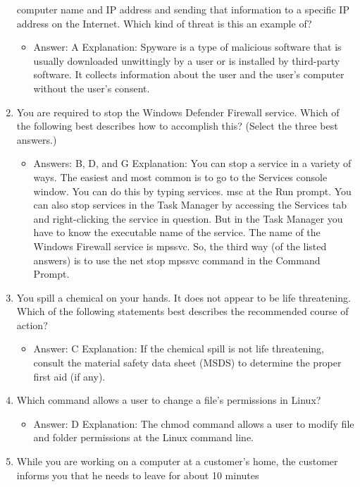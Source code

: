 \documentclass{article}
\begin{document}
\begin{enumerate}
computer name and IP address and sending that information to a
specific IP address on the Internet. Which kind of threat is this an
example of?
    \begin{itemize}
        \item Answer: A
Explanation: Spyware is a type of malicious software that is usually downloaded unwittingly
by a user or is installed by third-party software. It collects information about the
user and the user’s computer without the user’s consent.
    \end{itemize}
    \item You are required to stop the Windows Defender Firewall service.
Which of the following best describes how to accomplish this?
(Select the three best answers.)
    \begin{itemize}
        \item Answers: B, D, and G
Explanation: You can stop a service in a variety of ways. The easiest and most common
is to go to the Services console window. You can do this by typing services.
msc at the Run prompt. You can also stop services in the Task Manager by accessing
the Services tab and right-clicking the service in question. But in the Task Manager you
have to know the executable name of the service. The name of the Windows Firewall
service is mpssvc. So, the third way (of the listed answers) is to use the net stop
mpssvc command in the Command Prompt.
    \end{itemize}
    \item You spill a chemical on your hands. It does not appear to be life
threatening. Which of the following statements best describes the
recommended course of action?
    \begin{itemize}
        \item Answer: C
Explanation: If the chemical spill is not life threatening, consult the material safety data
sheet (MSDS) to determine the proper first aid (if any).
    \end{itemize}
    \item Which command allows a user to change a file’s permissions in Linux?
    \begin{itemize}
        \item Answer: D
Explanation: The chmod command allows a user to modify file and folder permissions
at the Linux command line.
    \end{itemize}
    \item While you are working on a computer at a customer’s home, the
customer informs you that he needs to leave for about 10 minutes

\end{enumerate}
\end{document}
